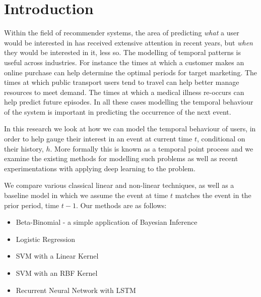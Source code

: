 
\chapter{Introduction} %

\label{Chapter1} %


\newcommand{\keyword}[1]{\textbf{#1}}
\newcommand{\tabhead}[1]{\textbf{#1}}
\newcommand{\code}[1]{\texttt{#1}}
\newcommand{\file}[1]{\texttt{\bfseries#1}}
\newcommand{\option}[1]{\texttt{\itshape#1}}

Within the field of recommender systems, the area of predicting \textit{what} a user would be interested in has received extensive attention in recent years, but \textit{when} they would be interested in it, less so.  The modelling of temporal patterns is useful across industries. For instance the times at which a customer makes an online purchase can help determine the optimal periods for target marketing. The times at which public transport users tend to travel can help better manage resources to meet demand. The times at which a medical illness re-occurs can help predict future episodes. In all these cases modelling the temporal behaviour of the system is important in predicting the occurrence of the next event. 

In this research we look at how we can model the temporal behaviour of users, in order to help gauge their interest in an event at current time $t$, conditional on their history, $h$. More formally this is known as a temporal point process and we examine the existing methods for modelling such problems as well as recent experimentations with applying deep learning to the problem.

We compare various classical linear and non-linear techniques, as well as a baseline model in which we assume the event at time $t$ matches the event in the prior period, time $t-1$. Our methods are as follows:
\begin{itemize}
	\item Beta-Binomial - a simple application of Bayesian Inference
	\item Logistic Regression
	\item SVM with a Linear Kernel
	\item SVM with an RBF Kernel
	\item Recurrent Neural Network with LSTM
\end{itemize}

